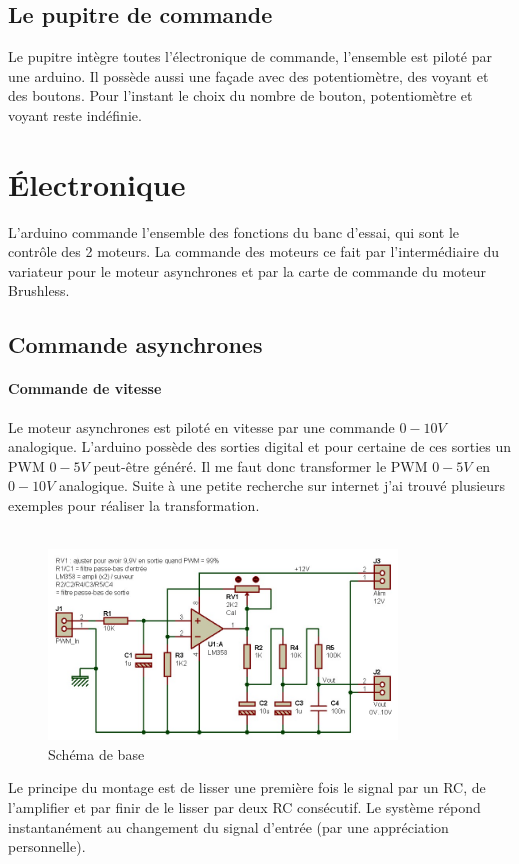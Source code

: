 \documentclass[11pt]{article}
\begin{document}
\subsection{Le pupitre de commande}
Le pupitre intègre toutes l'électronique de commande, l'ensemble est piloté par une arduino. Il possède aussi une façade avec des potentiomètre, des voyant et des boutons. Pour l'instant le choix du nombre de bouton, potentiomètre et voyant reste indéfinie.


\newpage

\section{Électronique}

L'arduino commande l'ensemble des fonctions du banc d'essai, qui sont le contrôle des 2 moteurs. La commande des moteurs ce fait par l'intermédiaire du variateur pour le moteur asynchrones et par la carte de commande du moteur Brushless. 

\subsection{Commande asynchrones}

\paragraph{Commande de vitesse \\}
Le moteur asynchrones est piloté en vitesse par une commande $0-10V$ analogique. L'arduino possède des sorties digital et pour certaine de ces sorties un PWM $0-5V$ peut-être généré. Il me faut donc transformer le PWM $0-5V$ en $0-10V$ analogique. Suite à une petite recherche sur internet j'ai trouvé plusieurs exemples pour réaliser la transformation.
\\
\\
\begin{figure}[!h]
    \centering
    \includegraphics[width=350px]{electronique_conv_pwm_tension.jpg}
    \caption{Schéma de base}
\end{figure}
\FloatBarrier
Le principe du montage est de lisser une première fois le signal par un RC, de l'amplifier et par finir de le lisser par deux RC consécutif. Le système répond instantanément au changement du signal d'entrée (par une appréciation personnelle).
\end{document}
